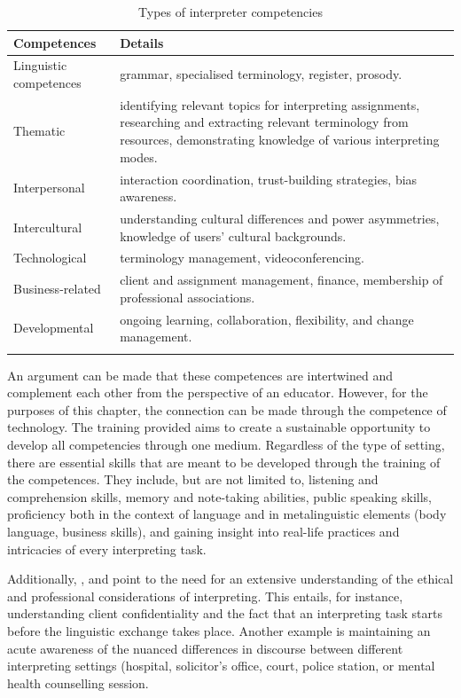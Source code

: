 \documentclass[output=paper]{langscibook}
\begin{document}
\begin{table}
\caption{\label{tab:11:1}Types of interpreter competencies}
\begin{tabularx}{\textwidth}{lQ}
\lsptoprule
Competences & Details\\
\midrule
Linguistic competences & grammar, specialised terminology, register, prosody.\\
Thematic & identifying relevant topics for interpreting assignments, researching and extracting relevant terminology from resources, demonstrating knowledge of various interpreting modes.\\
Interpersonal & interaction coordination, trust-building strategies, bias awareness.\\
Intercultural & understanding cultural differences and power asymmetries, knowledge of users’ cultural backgrounds.\\
Technological & terminology management, videoconferencing.\\
Business-related & client and assignment management, finance, membership of professional associations.\\
Developmental & ongoing learning, collaboration, flexibility, and change management.\\
\lspbottomrule
\end{tabularx}
\end{table}

An argument can be made that these competences are intertwined and complement each other from the perspective of an educator. However, for the purposes of this chapter, the connection can be made through the competence of technology. The training provided aims to create a sustainable opportunity to develop all competencies through one medium. Regardless of the type of setting, there are essential skills that are meant to be developed through the training of the competences. They include, but are not limited to, listening and comprehension skills, memory and note-taking abilities, public speaking skills, proficiency both in the context of language and in metalinguistic elements (body language, business skills), and gaining insight into real-life practices and intricacies of every interpreting task. 

Additionally, \citet{hale2007community},\citet{wadensjo2014interpreting}  \citet{tipton2016dialogue} and \citet{phelan2020ethics} point to the need for an extensive understanding of the ethical and professional considerations of interpreting. This entails, for instance, understanding client confidentiality and the fact that an interpreting task starts before the linguistic exchange takes place. Another example is maintaining an acute awareness of the nuanced differences in discourse between different interpreting settings (hospital, solicitor’s office, court, police station, or mental health counselling session.  
\end{document}
